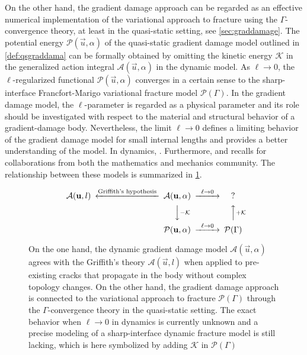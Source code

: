 On the other hand, the gradient damage approach can be regarded as an effective numerical implementation of the variational approach to fracture using the $\Gamma$-convergence theory, at least in the quasi-static setting, see \cref{sec:graddamage}. The potential energy $\mathcal{P}(\vec{u},\alpha)$ of the quasi-static gradient damage model outlined in \cref{def:qsgraddama} can be formally obtained by omitting the kinetic energy $\mathcal{K}$ in the generalized action integral $\mathcal{A}(\vec{u},\alpha)$ in the dynamic model. As $\ell\to 0$, the $\ell$-regularized functional $\mathcal{P}(\vec{u},\alpha)$ converges in a certain sense to the sharp-interface Francfort-Marigo variational fracture model $\mathcal{P}(\Gamma)$. In the gradient damage model, the $\ell$-parameter is regarded as a physical parameter and its role should be investigated with respect to the material and structural behavior of a gradient-damage body. Nevertheless, the limit $\ell\to 0$ defines a limiting behavior of the gradient damage model for small internal lengths and provides a better understanding of the model. In dynamics, . Furthermore,  and recalls for collaborations from both the mathematics and mechanics community. The relationship between these models is summarized in \cref{fig:griffithvariagraddama}.
\begin{figure}[htbp]
\centering
\[
\begin{CD}
\mathcal{A}(\vec{u},l) @<\text{Griffith's hypothesis}<< \mathcal{A}(\vec{u},\alpha) @>{\ell\to 0}>> ? \\
@. @VV{-\mathcal{K}}V @AA{+\mathcal{K}}A \\
@. \mathcal{P}(\vec{u},\alpha) @>{\ell\to 0}>> \mathcal{P}(\Gamma)
\end{CD}
\]
\caption{On the one hand, the dynamic gradient damage model $\mathcal{A}(\vec{u},\alpha)$ agrees with the Griffith's theory $\mathcal{A}(\vec{u},l)$ when applied to pre-existing cracks that propagate in the body without complex topology changes. On the other hand, the gradient damage approach is connected to the variational approach to fracture $\mathcal{P}(\Gamma)$ through the $\Gamma$-convergence theory in the quasi-static setting. The exact behavior when $\ell\to 0$ in dynamics is currently unknown and a precise modeling of a sharp-interface dynamic fracture model is still lacking, which is here symbolized by adding $\mathcal{K}$ in $\mathcal{P}(\Gamma)$} \label{fig:griffithvariagraddama}
\end{figure}

